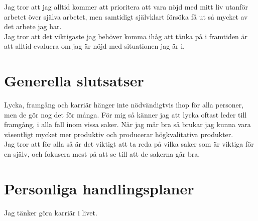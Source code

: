 \documentclass[12pt,a4paper]{article}
\begin{document}
Jag tror att jag alltid kommer att prioritera att vara nöjd med mitt liv utanför arbetet över själva arbetet, men samtidigt självklart försöka få ut så mycket av det arbete jag har.\\

Jag tror att det viktigaste jag behöver komma ihåg att tänka på i framtiden är att alltid evaluera om jag är nöjd med situationen jag är i. 

\section{Generella slutsatser}

Lycka, framgång och karriär hänger inte nödvändigtvis ihop för alla personer, men de gör nog det för många. För mig så känner jag att lycka oftast leder till framgång, i alla fall inom vissa saker. När jag mår bra så brukar jag kunna vara väsentligt mycket mer produktiv och producerar högkvalitativa produkter.\\

Jag tror att för alla så är det viktigt att ta reda på vilka saker som är viktiga för en själv, och fokusera mest på att se till att de sakerna går bra.

\section{Personliga handlingsplaner}

Jag tänker göra karriär i livet.
\end{document}
